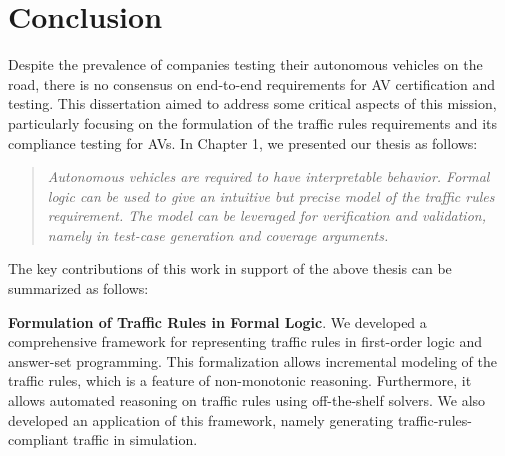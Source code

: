 \chapter[~~~~~~~~~~~~Conclusion]{Conclusion}
\label{ch:conclusion}

Despite the prevalence of companies testing their autonomous vehicles on the road, there is no consensus on end-to-end requirements for AV certification and testing.
%
This dissertation aimed to address some critical aspects of this mission, particularly focusing on the formulation of the traffic rules requirements and its compliance testing for AVs.
%
In Chapter 1, we presented our thesis as follows:
\begin{quote}
\textit{
    Autonomous vehicles are required to have interpretable behavior. Formal logic can be used to give an intuitive but precise model of the traffic rules requirement. The model can be leveraged for verification and validation, namely in test-case generation and coverage arguments.
}
\end{quote}
The key contributions of this work in support of the above thesis can be summarized as follows:

    \textbf{Formulation of Traffic Rules in Formal Logic}.
    We developed a comprehensive framework for representing traffic rules in first-order logic and answer-set programming.
    This formalization allows incremental modeling of the traffic rules, which is a feature of non-monotonic reasoning.
    Furthermore, it allows automated reasoning on traffic rules using off-the-shelf solvers.
    We also developed an application of this framework, namely generating traffic-rules-compliant traffic in simulation.

